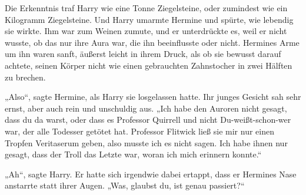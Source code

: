 Die Erkenntnis traf Harry wie eine Tonne Ziegelsteine, oder zumindest wie ein Kilogramm Ziegelsteine.
Und Harry umarmte Hermine und spürte, wie lebendig sie wirkte. Ihm war zum Weinen zumute, und er unterdrückte es, weil er nicht wusste, ob das nur ihre Aura war, die ihn beeinflusste oder nicht.
Hermines Arme um ihn waren sanft, äußerst leicht in ihrem Druck, als ob sie bewusst darauf achtete, seinen Körper nicht wie einen gebrauchten Zahnstocher in zwei Hälften zu brechen.

„Also“, sagte Hermine, als Harry sie losgelassen hatte. Ihr junges Gesicht sah sehr ernst, aber auch rein und unschuldig aus.
„Ich habe den Auroren nicht gesagt, dass du da warst, oder dass es Professor Quirrell und nicht Du-weißt-schon-wer war, der alle Todesser getötet hat. Professor Flitwick ließ sie mir nur einen Tropfen Veritaserum geben, also musste ich es nicht sagen. Ich habe ihnen nur gesagt, dass der Troll das Letzte war, woran ich mich erinnern konnte.“

„Ah“, sagte Harry. Er hatte sich irgendwie dabei ertappt, dass er Hermines Nase anstarrte statt ihrer Augen.
„Was, glaubst du, ist genau passiert?“

